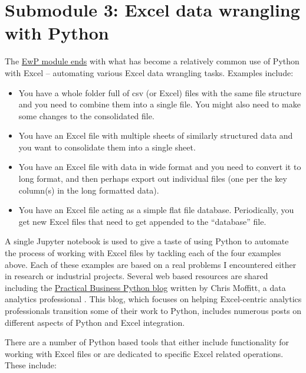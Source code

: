 \documentclass[ited]{informs3}                      %
\begin{document}
\section{Submodule 3: Excel data wrangling with Python}

The \href{http://www.sba.oakland.edu/faculty/isken/courses/aap/mod3c_python_excel.html}{EwP module ends} with what has become a relatively common use of Python with Excel -- automating various Excel data wrangling tasks. Examples include:

\begin{itemize}
	\item
	You have a whole folder full of csv (or Excel) files with the same
	file structure and you need to combine them into a single file. You
	might also need to make some changes to the consolidated file.
	\item
	You have an Excel file with multiple sheets of similarly structured
	data and you want to consolidate them into a single sheet.
	\item
	You have an Excel file with data in wide format and you need to
	convert it to long format, and then perhaps export out individual
	files (one per the key column(s) in the long formatted data).
	\item
	You have an Excel file acting as a simple flat file database.
	Periodically, you get new Excel files that need to get appended to the
	``database'' file.
\end{itemize}

A single Jupyter notebook is used to give a taste of using Python to automate the process of working with Excel files by tackling each of the four examples above. Each of these examples are based on a real problems I encountered either in research or industrial projects. Several web based resources are shared including the \href{https://pbpython.com/}{Practical Business Python blog} written by Chris Moffitt, a data analytics professional \citep{moffittPracticalBusinessPython2022}. This blog, which focuses on helping Excel-centric analytics professionals transition some of their work to Python, includes numerous posts on different aspects of Python and Excel integration.  

There are a number of Python based tools that either include functionality for working with Excel files or are dedicated to specific Excel related operations. These include:
\end{document}
